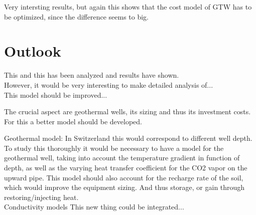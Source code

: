 \documentclass{article}
\begin{document}
Very intersting results, but again this shows that the cost model of GTW has to be optimized, since the difference seems to big.



\section{Outlook}
This and this has been analyzed and results have shown.\\

However, it would be very interesting to make detailed analysis of...\\

This model should be improved...

The crucial aspect are geothermal wells, its sizing and thus its investment costs. For this a better model should be developed.

Geothermal model: In Switzerland this would correspond to different well depth. To study this thoroughly it would be necessary to have a model for the geothermal well, taking into account the temperature gradient in function of depth, as well as the varying heat transfer coefficient for the CO2 vapor on the upward pipe\cite{badacheExperimentalStudyCarbon2018,lamarcheReviewMethodsEvaluate2010}. This model should also account for the recharge rate of the soil, which would improve the equipment sizing. And thus storage, or gain through restoring/injecting heat.\\
Conductivity models \cite{jiaReviewEffectiveThermal2019,lamarcheReviewMethodsEvaluate2010,zengHeatTransferAnalysis2003a}
This new thing could be integrated...\\
\end{document}
